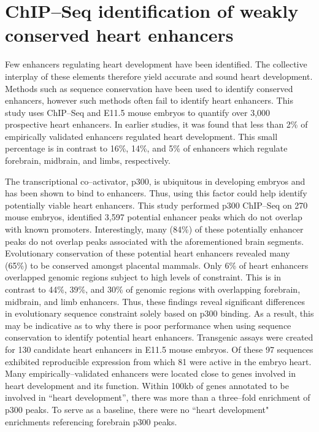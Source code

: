 \documentclass{article}
\begin{document}
	
\section*{ChIP--Seq identification of weakly conserved heart enhancers \cite{blow-naturegen-2010}}
	Few enhancers regulating heart development have been identified. The collective interplay of these
	elements therefore yield accurate and sound heart development. Methods such as sequence conservation have 
	been used to identify conserved enhancers, however such methods often fail to identify heart enhancers.
	This study uses ChIP--Seq and E11.5 mouse embryos to quantify over 3,000 prospective heart enhancers.
	In earlier studies, it was found that less than 2\% of empirically validated enhancers regulated heart development. 
	This small percentage is in contrast to 16\%, 14\%, and 5\% of enhancers which regulate forebrain, midbrain, and
	limbs, respectively.
	
	The transcriptional co--activator, p300, is ubiquitous in developing embryos and has been shown to bind to enhancers.
	Thus, using this factor could help identify potentially viable heart enhancers. This study performed p300 ChIP--Seq on
	270 mouse embryos, identified 3,597 potential enhancer peaks which do not overlap with known promoters.
	Interestingly, many (84\%) of these potentially enhancer peaks do not overlap peaks associated with the aforementioned
	brain segments. Evolutionary conservation of these potential heart enhancers revealed many (65\%) to be conserved amongst placental
	mammals. Only 6\% of heart enhancers overlapped genomic regions subject to high levels of constraint. This is in
	contrast to 44\%, 39\%, and 30\% of genomic regions with overlapping forebrain, midbrain, and limb enhancers.
	Thus, these findings reveal significant differences in evolutionary sequence constraint solely based on 
	p300 binding. As a result, this may be indicative as to why there is poor performance when using sequence conservation
	to identify potential heart enhancers.
	Transgenic assays were created for 130 candidate heart enhancers in E11.5 mouse embryos. Of these 97 sequences exhibited
	reproducible expression from which 81 were active in the embryo heart. Many empirically--validated enhancers were located close to
	genes involved in heart development and its function. Within 100kb of genes annotated to be involved in ``heart development'', there
	was more than a three--fold enrichment of p300 peaks. To serve as a baseline, there were no ``heart development" enrichments referencing 
	forebrain p300 peaks. 



\end{document}
